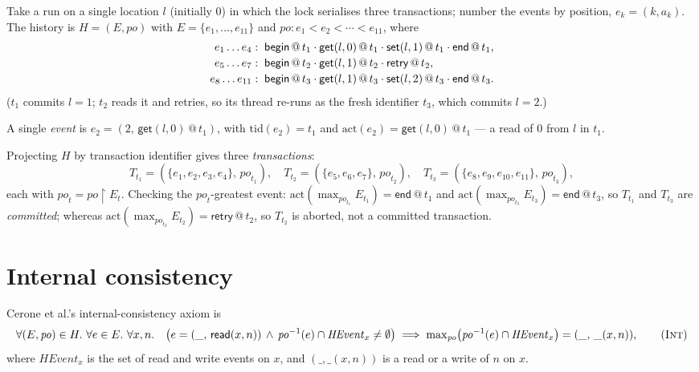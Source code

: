 \documentclass[manuscript,nonacm]{acmart}
\makeatletter
\theoremstyle{acmdefinition}
\newcommand{\bbegin}{\textsf{begin}}
\newcommand{\eend}{\textsf{end}}
\newcommand{\retry}{\textsf{retry}}
\newcommand{\getev}[3]{\textsf{get}(#1,#2)\,@\,#3}
\newcommand{\setev}[3]{\textsf{set}(#1,#2)\,@\,#3}
\newcommand{\HEvent}{\mathit{HEvent}}
\newcommand{\rdev}[2]{\mathsf{read}(#1,#2)}
\newcommand{\po}{\mathit{po}}
\newcommand{\maxpo}{\mathrm{max}_{\po}}
\newcommand{\anyop}[2]{\mathord{\_}(#1,#2)} %
\makeatother
\begin{document}
\begin{example}
Take a run on a single location $l$ (initially $0$) in which the lock serialises
three transactions; number the events by position, $e_k=(k,a_k)$. The history is
$H = (E,\po)$ with $E=\{e_1,\dots,e_{11}\}$ and $\po: e_1 < e_2 < \cdots < e_{11}$,
where
\[
\begin{array}{r@{\;\;}l}
e_1 \dots e_4    :& \bbegin\,@\,t_1 \cdot \getev{l}{0}{t_1} \cdot \setev{l}{1}{t_1} \cdot \eend\,@\,t_1,\\[2pt]
e_5 \dots e_7    :& \bbegin\,@\,t_2 \cdot \getev{l}{1}{t_2} \cdot \retry\,@\,t_2,\\[2pt]
e_8 \dots e_{11} :& \bbegin\,@\,t_3 \cdot \getev{l}{1}{t_3} \cdot \setev{l}{2}{t_3} \cdot \eend\,@\,t_3.
\end{array}
\]
($t_1$ commits $l=1$; $t_2$ reads it and retries, so its thread re-runs as the
fresh identifier $t_3$, which commits $l=2$.)

A single \emph{event} is $e_2 = (2,\, \getev{l}{0}{t_1})$, with
$\mathrm{tid}(e_2)=t_1$ and $\mathrm{act}(e_2)=\getev{l}{0}{t_1}$ --- a read of $0$
from $l$ in $t_1$.

Projecting $H$ by transaction identifier gives three \emph{transactions}:
\[
T_{t_1} = (\{e_1,e_2,e_3,e_4\},\, \po_{t_1}), \quad
T_{t_2} = (\{e_5,e_6,e_7\},\, \po_{t_2}), \quad
T_{t_3} = (\{e_8,e_9,e_{10},e_{11}\},\, \po_{t_3}),
\]
each with $\po_t = \po \restriction E_t$. Checking the $\po_t$-greatest event:
$\mathrm{act}(\max_{\po_{t_1}}E_{t_1}) = \eend\,@\,t_1$ and
$\mathrm{act}(\max_{\po_{t_3}}E_{t_3}) = \eend\,@\,t_3$, so $T_{t_1}$ and $T_{t_3}$
are \emph{committed}; whereas
$\mathrm{act}(\max_{\po_{t_2}}E_{t_2}) = \retry\,@\,t_2$, so $T_{t_2}$ is aborted,
not a committed transaction.
\end{example}

\section{Internal consistency}
\label{sec:int}

Cerone et al.'s internal-consistency axiom is
\[
\forall (E, \po) \in H.\ \forall e \in E.\ \forall x, n.\quad
\bigl(e = (\_,\, \rdev{x}{n}) \,\wedge\, \po^{-1}(e) \cap \HEvent_x \neq \emptyset\bigr)
\implies
\maxpo\bigl(\po^{-1}(e) \cap \HEvent_x\bigr) = (\_,\, \anyop{x}{n}),
\tag{\textsc{Int}}
\]
where $\HEvent_x$ is the set of read and write events on $x$, and
$(\_,\anyop{x}{n})$ is a read or a write of $n$ on $x$.
\end{document}
